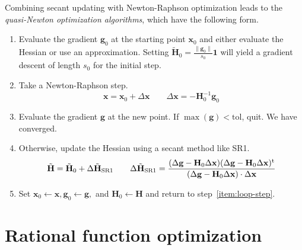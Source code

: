 \documentclass[11pt]{article}
\begin{document}
Combining secant updating with Newton-Raphson optimization leads to the
{\itshape quasi-Newton optimization algorithms}, which have the following form.
\begin{enumerate}
    \item
        Evaluate the gradient \(\mathbf{g}_0\) at the starting point
        \(\mathbf{x}_0\) and either evaluate the Hessian or use an
        approximation.
        Setting
        \(
            \tilde{\mathbf{H}}_0
            =
            \tfrac{\|\mathbf{g}_0\|}{s_0}
            \mathbf{1}
        \)
        will yield a gradient descent of length \(s_0\) for the initial step.
    \item
        \label{item:loop-step}
        Take a Newton-Raphson step.
        \[
            \mathbf{x}
            =
            \mathbf{x}_0
            +
            \Delta\mathbf{x}
            \qquad
            \Delta\mathbf{x}
            =
            -
            \mathbf{H}_0^{-1}
            \mathbf{g}_0
        \]
    \item
        Evaluate the gradient \(\mathbf{g}\) at the new point.
        If \(\max(\mathbf{g})<\mathrm{tol}\), quit.
        We have converged.
    \item
        Otherwise, update the Hessian using a secant method like SR1.
        \[
            \tilde{\mathbf{H}}
            =
            \tilde{\mathbf{H}}_0
            +
            \Delta\tilde{\mathbf{H}}_\mathrm{SR1}
            \qquad
            \Delta\tilde{\mathbf{H}}_\mathrm{SR1}
            =
            \frac{%
                (
                    \Delta\mathbf{g}
                    -
                    \mathbf{H}_0
                    \Delta\mathbf{x}
                )
                (
                    \Delta\mathbf{g}
                    -
                    \mathbf{H}_0
                    \Delta\mathbf{x}
                )^\mathrm{t}
            }{%
                (
                    \Delta\mathbf{g}
                    -
                    \mathbf{H}_0
                    \Delta\mathbf{x}
                )\cdot
                \Delta\mathbf{x}
            }
        \]
    \item
        Set
        \(
            \mathbf{x}_0\leftarrow \mathbf{x},
            \mathbf{g}_0\leftarrow \mathbf{g},
        \)
        and
        \(
            \mathbf{H}_0\leftarrow \mathbf{H}
        \)
        and return to step~\ref{item:loop-step}.
\end{enumerate}


\section*{Rational function optimization}
\end{document}
